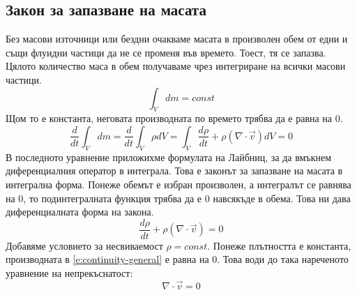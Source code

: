 \documentclass[12pt]{article}
\numberwithin{equation}{section}
\newcommand{\vel}{\vec{v}}
\begin{document}
\subsection{Закон за запазване на масата}
Без масови източници или бездни очакваме масата в произволен обем от едни и същи флуидни частици да не се променя във времето. Тоест, тя се запазва. Цялото количество маса в обем получаваме чрез интегриране на всички масови частици.
\begin{equation}
    \int_V dm = const
\end{equation}
Щом то е константа, неговата производната по времето трябва да е равна на 0.
\begin{equation}
    \frac{d}{dt}\int_V dm = \frac{d}{dt}\int_V \rho dV = \int_V \frac{d\rho}{dt} + \rho(\nabla\cdot\vel) dV=0
\end{equation}
В последното уравнение приложихме формулата на Лайбниц, за да вмъкнем диференциалния оператор в интеграла. Това е законът за запазване на масата в интегрална форма. Понеже обемът е избран произволен, а интегралът се равнява на 0, то подинтегралната функция трябва да е 0 навсякъде в обема. Това ни дава диференциалната форма на закона.
\begin{equation}
    \label{e:continuity-general}
    \frac{d\rho}{dt} + \rho(\nabla\cdot\vel)=0
\end{equation}
Добавяме условието за несвиваемост $\rho=const$. Понеже плътността е константа, производната в \autoref{e:continuity-general} е равна на 0. Това води до така нареченото уравнение на непрекъснатост:
\begin{equation}
    \label{e:continuity-case}
    \nabla\cdot\vel=0
\end{equation}
\end{document}
